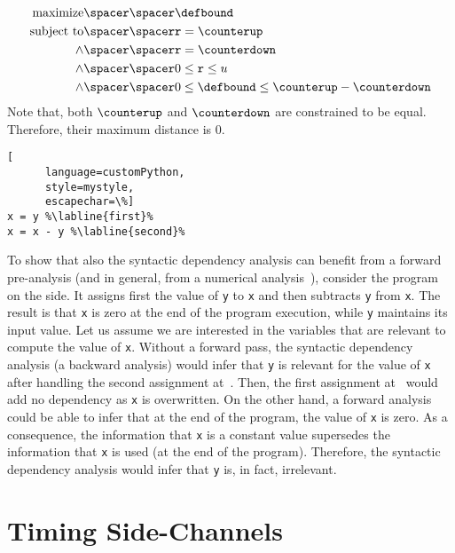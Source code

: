 \begin{example}
\begin{align}
  \text{maximize} \spacer\spacer& \defbound \\
  \text{subject to} \spacer\spacer
    & \texttt{r} = \counterup \\
    \land\spacer\spacer& \texttt{r} = \counterdown \\
    \land\spacer\spacer& 0\le \texttt{r} \le u \\
    \land\spacer\spacer& 0 \le \defbound \le \counterup - \counterdown
\end{align}
Note that, both $\counterup$ and $\counterdown$ are constrained to be equal. Therefore, their maximum distance is $0$.
\end{example}

\begin{marginlisting}[*1]
  \begin{lstlisting}[
      language=customPython,
      style=mystyle,
      escapechar=\%]
x = y %\labline{first}%
x = x - y %\labline{second}%
\end{lstlisting}
  \end{marginlisting}
\begin{example}
  To show that also the syntactic dependency analysis can benefit from a forward pre-analysis (and in general, from a numerical analysis~), consider the program on the side.
  It assigns first the value of \texttt{y} to \texttt{x} and then subtracts \texttt{y} from \texttt{x}.
  The result is that \texttt{x} is zero at the end of the program execution, while \texttt{y} maintains its input value.
%
  Let us assume we are interested in the variables that are relevant to compute the value of \texttt{x}.
  Without a forward pass, the syntactic dependency analysis (a backward analysis) would infer that \texttt{y} is relevant for the value of \texttt{x} after handling the second assignment at~. Then, the first assignment at~ would add no dependency as \texttt{x} is overwritten.
  On the other hand, a forward analysis could be able to infer that at the end of the program, the value of \texttt{x} is zero.
  As a consequence, the information that \texttt{x} is a constant value supersedes the information that \texttt{x} is used (at the end of the program).
  Therefore, the syntactic dependency analysis would infer that \texttt{y} is, in fact, irrelevant.
\end{example}


\section{Timing Side-Channels}


